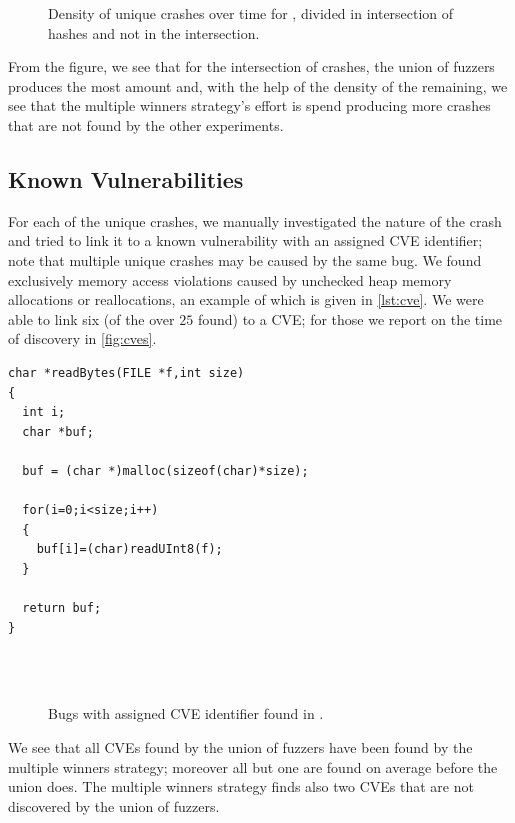 \begin{figure}[h]
    \centering%
    \caption{Density of unique crashes over time for \listswf, divided in
    intersection of hashes and not in the intersection.}
    \label{fig:unique-crashes-inter}
\end{figure}

From the figure, we see that for the intersection of crashes, the union of
fuzzers produces the most amount and, with the help of the density of the
remaining, we see that the multiple winners strategy's effort is spend producing
more crashes that are not found by the other experiments.

\subsection{Known Vulnerabilities}

For each of the unique crashes, we manually investigated the nature of the crash
and tried to link it to a known vulnerability with an assigned \ac{CVE}
identifier; note that multiple unique crashes may be caused by the same bug. We
found exclusively memory access violations caused by unchecked heap memory
allocations or reallocations, an example of which is given in \autoref{lst:cve}.
We were able to link six (of the over $25$ found) to a \ac{CVE}; for those we
report on the time of discovery in \autoref{fig:cves}.

\begin{lstlisting}[caption={Unchecked memory allocation in
                            \texttt{util/read.c:222} causing CVE-2017-7582.},
                   label=lst:cve, float, floatplacement=h]
char *readBytes(FILE *f,int size)
{
  int i;
  char *buf;

  buf = (char *)malloc(sizeof(char)*size);

  for(i=0;i<size;i++)
  {
    buf[i]=(char)readUInt8(f);
  }

  return buf;
}
\end{lstlisting}

\begin{figure}[t]
    \centering%
    \\
    \\
    \caption{Bugs with assigned \acs{CVE} identifier found in \listswf.}
    \label{fig:cves}
\end{figure}

We see that all \acp{CVE} found by the union of fuzzers have been found by the
multiple winners strategy; moreover all but one are found on average before the
union does. The multiple winners strategy finds also two \acp{CVE} that are not
discovered by the union of fuzzers.

